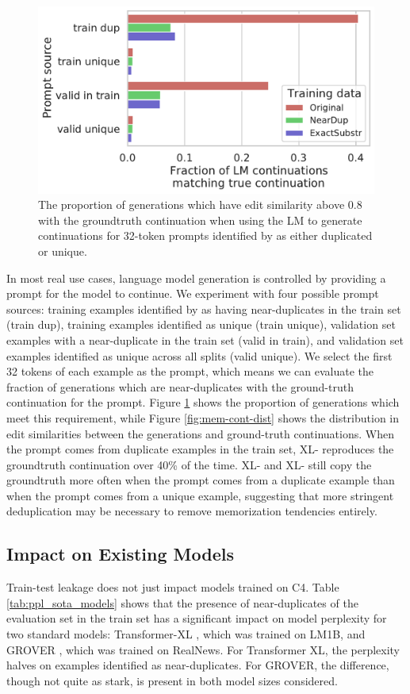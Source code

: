 \begin{figure}[h]
    \centering
    \small
    \includegraphics[width=0.6\linewidth]{figures/memorized_continuations_fraction}
    \caption{The proportion of generations which have edit similarity above 0.8 with the groundtruth continuation when using the LM to generate continuations for 32-token prompts identified by \Approx{} as either duplicated or unique.}
    \label{fig:ground-truth-continuation}
\end{figure}

In most real use cases, language model generation is controlled by providing a prompt for the model to continue.
We experiment with four possible prompt sources: training examples identified by \Exact{} as having near-duplicates in the train set (train dup), training examples identified as unique (train unique), validation set examples with a near-duplicate in the train set (valid in train), and validation set examples identified as unique across all splits (valid unique).
We select the first 32 tokens of each example as the prompt, which means we can evaluate the fraction of generations which are near-duplicates with the ground-truth continuation for the prompt.
Figure \ref{fig:ground-truth-continuation} shows the proportion of generations which meet this requirement, while Figure \ref{fig:mem-cont-dist} shows the distribution in edit similarities between the generations and ground-truth continuations.
When the prompt comes from duplicate examples in the train set, XL-\Original{} reproduces the groundtruth continuation over 40\% of the time.
XL-\Exact{} and XL-\Approx{} still copy the groundtruth more often when the prompt comes from a duplicate example than when the prompt comes from a unique example, suggesting that more stringent deduplication may be necessary to remove memorization tendencies entirely. 



\subsection{Impact on Existing Models} \label{sec:eval-existing-models}
Train-test leakage does not just impact models trained on C4.
Table \ref{tab:ppl_sota_models} shows that
the presence of near-duplicates of the evaluation set
in the train set has a significant impact on model perplexity for two standard models: Transformer-XL \citep{dai2019transformer}, which was trained on LM1B, and GROVER \citep{zellers2019defending}, which was trained on RealNews.
For Transformer XL, the perplexity halves on examples identified as near-duplicates.
For GROVER, the difference, though not quite as stark, is present in both model sizes considered.

